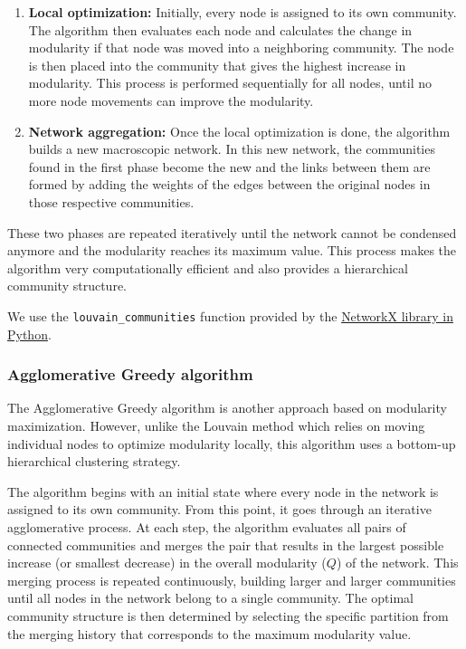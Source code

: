 \documentclass{article}
\begin{document}
\begin{enumerate}
    \item \textbf{Local optimization:} Initially, every node is assigned to its own community. The algorithm then evaluates each node and calculates the change in modularity if that node was moved into a neighboring community. The node is then placed into the community that gives the highest increase in modularity. This process is performed sequentially for all nodes, until no more node movements can improve the modularity.
    \item \textbf{Network aggregation:} Once the local optimization is done, the algorithm builds a new macroscopic network. In this new network, the communities found in the first phase become the new  and the links between them are formed by adding the weights of the edges between the original nodes in those respective communities.
\end{enumerate}

These two phases are repeated iteratively until the network cannot be condensed anymore and the modularity reaches its maximum value. This process makes the algorithm very computationally efficient and also provides a hierarchical community structure.

We use the \texttt{louvain\_communities} function provided by the \href{https://networkx.org/documentation/stable/reference/algorithms/generated/networkx.algorithms.community.louvain.louvain_communities.html}{NetworkX library in Python}.


\subsubsection{Agglomerative Greedy algorithm}

The Agglomerative Greedy algorithm \cite{newman2004fast, clauset2004finding} is another approach based on modularity maximization. However, unlike the Louvain method which relies on moving individual nodes to optimize modularity locally, this algorithm uses a bottom-up hierarchical clustering strategy. 

The algorithm begins with an initial state where every node in the network is assigned to its own community. From this point, it goes through an iterative agglomerative process. At each step, the algorithm evaluates all pairs of connected communities and merges the pair that results in the largest possible increase (or smallest decrease) in the overall modularity ($Q$) of the network. This merging process is repeated continuously, building larger and larger communities until all nodes in the network belong to a single community. The optimal community structure is then determined by selecting the specific partition from the merging history that corresponds to the maximum modularity value.
\end{document}
